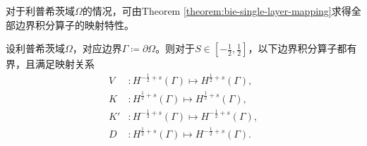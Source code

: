 对于利普希茨域$\Omega$的情况，可由Theorem \ref{theorem:bie-single-layer-mapping}求得全部边界积分算子的映射特性。
\begin{theorem}[边界积分算子的映射特性]
  \label{theorem:bie-mapping-operators}
  设利普希茨域$\Omega$，对应边界$\Gamma \coloneqq \partial \Omega$。则对于$S \in \left[ - \frac{1}{2}, \frac{1}{2} \right]$，以下边界积分算子都有界，且满足映射关系\citep{Costabel:1988dw}
  \begin{equation*}
    \begin{split}
      V&: H^{-\frac{1}{2}+s} (\Gamma) \mapsto H^{\frac{1}{2}+s}(\Gamma), \\
      K&: H^{\frac{1}{2}+s} (\Gamma) \mapsto H^{\frac{1}{2}+s}(\Gamma), \\
      K'&:H^{-\frac{1}{2}+s} (\Gamma) \mapsto H^{-\frac{1}{2}+s}(\Gamma),\\
      D &: H^{\frac{1}{2}+s} (\Gamma) \mapsto H^{-\frac{1}{2}+s}(\Gamma).
    \end{split}
  \end{equation*}
\end{theorem}
